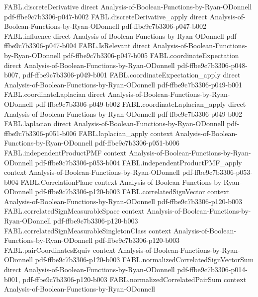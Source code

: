 \begin{theorem}
  {FABL.discreteDerivative}
  {direct}
  {Analysis-of-Boolean-Functions-by-Ryan-ODonnell}
  {pdf-ffbe9c7b3306-p047-b002}
\proofstep
  {FABL.discreteDerivative_apply}
  {direct}
  {Analysis-of-Boolean-Functions-by-Ryan-ODonnell}
  {pdf-ffbe9c7b3306-p047-b002}
\proofstep
  {FABL.influence}
  {direct}
  {Analysis-of-Boolean-Functions-by-Ryan-ODonnell}
  {pdf-ffbe9c7b3306-p047-b004}
\proofstep
  {FABL.IsRelevant}
  {direct}
  {Analysis-of-Boolean-Functions-by-Ryan-ODonnell}
  {pdf-ffbe9c7b3306-p047-b005}
\proofstep
  {FABL.coordinateExpectation}
  {direct}
  {Analysis-of-Boolean-Functions-by-Ryan-ODonnell}
  {pdf-ffbe9c7b3306-p048-b007,
    pdf-ffbe9c7b3306-p049-b001}
\proofstep
  {FABL.coordinateExpectation_apply}
  {direct}
  {Analysis-of-Boolean-Functions-by-Ryan-ODonnell}
  {pdf-ffbe9c7b3306-p049-b001}
\proofstep
  {FABL.coordinateLaplacian}
  {direct}
  {Analysis-of-Boolean-Functions-by-Ryan-ODonnell}
  {pdf-ffbe9c7b3306-p049-b002}
\proofstep
  {FABL.coordinateLaplacian_apply}
  {direct}
  {Analysis-of-Boolean-Functions-by-Ryan-ODonnell}
  {pdf-ffbe9c7b3306-p049-b002}
\proofstep
  {FABL.laplacian}
  {direct}
  {Analysis-of-Boolean-Functions-by-Ryan-ODonnell}
  {pdf-ffbe9c7b3306-p051-b006}
\proofstep
  {FABL.laplacian_apply}
  {context}
  {Analysis-of-Boolean-Functions-by-Ryan-ODonnell}
  {pdf-ffbe9c7b3306-p051-b006}
\proofstep
  {FABL.independentProductPMF}
  {context}
  {Analysis-of-Boolean-Functions-by-Ryan-ODonnell}
  {pdf-ffbe9c7b3306-p053-b004}
\proofstep
  {FABL.independentProductPMF_apply}
  {context}
  {Analysis-of-Boolean-Functions-by-Ryan-ODonnell}
  {pdf-ffbe9c7b3306-p053-b004}
\proofstep
  {FABL.CorrelationPlane}
  {context}
  {Analysis-of-Boolean-Functions-by-Ryan-ODonnell}
  {pdf-ffbe9c7b3306-p120-b003}
\proofstep
  {FABL.correlatedSignVector}
  {context}
  {Analysis-of-Boolean-Functions-by-Ryan-ODonnell}
  {pdf-ffbe9c7b3306-p120-b003}
\proofstep
  {FABL.correlatedSignMeasurableSpace}
  {context}
  {Analysis-of-Boolean-Functions-by-Ryan-ODonnell}
  {pdf-ffbe9c7b3306-p120-b003}
\proofstep
  {FABL.correlatedSignMeasurableSingletonClass}
  {context}
  {Analysis-of-Boolean-Functions-by-Ryan-ODonnell}
  {pdf-ffbe9c7b3306-p120-b003}
\proofstep
  {FABL.pairCoordinatesEquiv}
  {context}
  {Analysis-of-Boolean-Functions-by-Ryan-ODonnell}
  {pdf-ffbe9c7b3306-p120-b003}
\proofstep
  {FABL.normalizedCorrelatedSignVectorSum}
  {direct}
  {Analysis-of-Boolean-Functions-by-Ryan-ODonnell}
  {pdf-ffbe9c7b3306-p014-b001,
    pdf-ffbe9c7b3306-p120-b003}
\proofstep
  {FABL.normalizedCorrelatedPairSum}
  {context}
  {Analysis-of-Boolean-Functions-by-Ryan-ODonnell}

\end{theorem}
